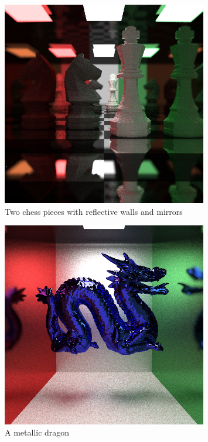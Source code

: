 \documentclass[../main.tex]{subfiles}
\begin{document}
\begin{figure}[h]
    \centering
    \includegraphics[width=0.8\textwidth]{images/Chess.png}
    \caption{Two chess pieces with reflective walls and mirrors}
    \label{fig:Chess}
\end{figure}
\begin{figure}[h]
    \centering
    \includegraphics[width=0.8\textwidth]{images/Dragon1.png}
    \caption{A metallic dragon}
    \label{fig:Dragon}
\end{figure}
\end{document}
